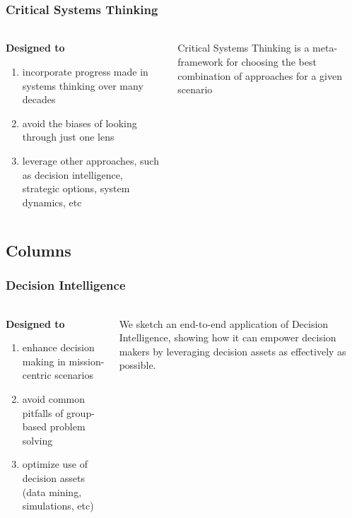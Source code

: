 \documentclass[
	11pt, %
]{beamer}
\begin{document}
\begin{frame}
	\frametitle{Critical Systems Thinking \cite{p1}}
	\framesubtitle{} %

	\begin{columns}[c] %
		\begin{column}{0.45\textwidth} %
			\textbf{Designed to}
			\begin{enumerate}
				\item incorporate progress made in systems thinking over many decades
				\item avoid the biases of looking through just one lens
				\item leverage other approaches, such as decision intelligence, strategic options, system dynamics, etc
			\end{enumerate}
		\end{column}
		\begin{column}{0.5\textwidth} %
		    Critical Systems Thinking is a meta-framework for choosing the best combination of approaches for a given scenario
		\end{column}
	\end{columns}
\end{frame}

\subsection{Columns}

\begin{frame}
	\frametitle{Decision Intelligence \cite{p2}}
	\framesubtitle{} %
	
	\begin{columns}[c] %
		\begin{column}{0.45\textwidth} %
			\textbf{Designed to}
			\begin{enumerate}
				\item enhance decision making in mission-centric scenarios
				\item avoid common pitfalls of group-based problem solving
				\item optimize use of decision assets (data mining, simulations, etc)
			\end{enumerate}
		\end{column}
		\begin{column}{0.5\textwidth} %
			We sketch an end-to-end application of Decision Intelligence, showing how it can empower decision makers by leveraging decision assets as effectively as possible.
		\end{column}
	\end{columns}
\end{frame}
\end{document}
